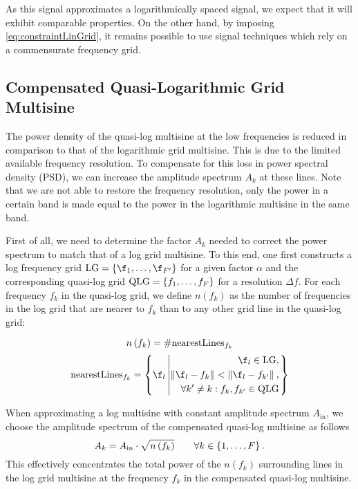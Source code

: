   As this signal approximates a logarithmically spaced signal,  we expect that it will exhibit comparable properties.
  On the other hand, by imposing \eqref{eq:constraintLinGrid}, it remains
  possible to use signal techniques which rely on a commensurate frequency grid.

\subsection{Compensated Quasi-Logarithmic Grid Multisine}
  The power density of the quasi-log multisine at the low frequencies is reduced in comparison to that of the logarithmic grid multisine.
  This is due to the limited available frequency resolution.
  To compensate for this loss in power spectral density (PSD), we can increase the amplitude spectrum $A_k$ at these lines.
  Note that we are not able to restore the frequency resolution, only the power in a certain band is made equal to the power in the logarithmic multisine in the same band.

  First of all, we need to determine the factor $A_k$ needed to correct the power spectrum to match that of a log grid multisine.
  To this end, one first constructs a log frequency grid $\LOGGRID = \set{\f_1, \ldots, \f_{F'}}$ for a given factor $\alpha$ and the corresponding quasi-log grid $\mathrm{QLG} = \left\{f_1, \ldots, f_F\right\}$ for a resolution $\Delta f$.
  For each frequency $f_k$ in the quasi-log grid, we define $n\left(f_k\right)$
  as the number of frequencies in the log grid that are nearer to $f_k$
  than to any other grid line in the quasi-log grid:
  
  \begin{equation}
    n\left(f_k\right) = \# \mathrm{nearestLines}_{f_k}
    \label{eq:nfk}
  \end{equation}
  \begin{equation}
    \mathrm{nearestLines}_{f_k} =
      \left\{ 
        \f_l \given{\begin{aligned} 
                       \f_l \in \LOGGRID, \\
                       \norm{\f_l - f_k} < \norm{\f_l - f_{k'}},\\
                       \forall k' \neq k: f_k, f_{k'} \in \QLOGGRID
                    \end{aligned}}
      \right\}
    \label{eq:nearestLines}
  \end{equation}  
  
  When approximating a log multisine with constant amplitude spectrum $A_{\mathrm{in}}$, we choose the amplitude spectrum of the compensated quasi-log multisine as follows
  \begin{equation}
    A_k = A_{\mathrm{in}} \cdot \sqrt{n\left(f_k\right)}\qquad \forall k \in \left\{1,\ldots,F\right\}
  \text{.}
  \label{eq:compensationAk}
  \end{equation}
  This effectively concentrates the total power of the $n\left( f_k \right)$ surrounding lines in the log grid multisine at the frequency $f_k$ in the compensated quasi-log multisine.
  
